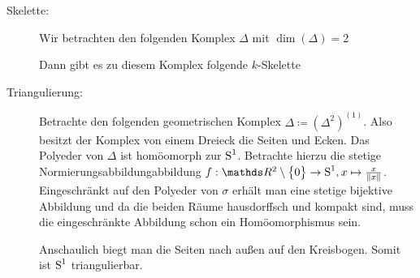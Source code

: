 \begin{Bsp}\label{bsp:triangulierung}
  \begin{description}
  \item[Skelette:] Wir betrachten den folgenden Komplex $\Delta$ mit %
    $\dim(\Delta)=2$\\
    \begin{center}
  \end{center}
  Dann gibt es zu diesem Komplex folgende $k$-Skelette\\
  \begin{center}
    \parbox{0.7\linewidth}{%
  \hfill
  }
\end{center}  

\item[Triangulierung:] Betrachte den folgenden geometrischen Komplex
  $\Delta \coloneqq (\Delta^2)^{(1)}$. Also besitzt der Komplex von
  einem Dreieck die Seiten und Ecken. Das Polyeder von $\Delta$ ist
  homöomorph zur $\operatorname{S}^1$. Betrachte hierzu die stetige
  Normierungsabbildungabbildung
  $f : \R^2 \setminus \sset{0} \rightarrow \Sp^1 , x \mapsto
  \frac{x}{\nn[x]}$.
  Eingeschränkt auf den Polyeder von $\sigma$ erhält man eine stetige
  bijektive Abbildung und da die beiden Räume hausdorffsch und kompakt
  sind, muss die eingeschränkte Abbildung schon ein Homöomorphismus
  sein.
  \begin{center}
\end{center}
Anschaulich biegt man die Seiten nach außen auf den Kreisbogen. Somit
ist $\operatorname{S}^1$ triangulierbar.
\end{description}
\end{Bsp}

